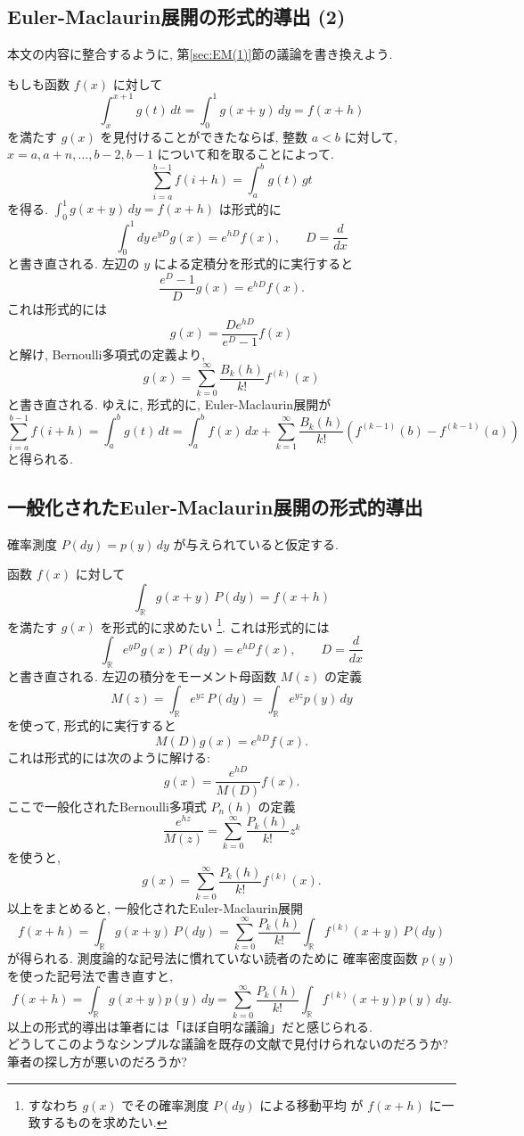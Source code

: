 \documentclass[12pt,twoside]{jarticle}
\newcommand\R{{\mathbb R}} %
\newcommand\PM{P} %
\newcommand\PDF{p} %
\theoremstyle{jplain}
\theoremstyle{jplain}
\theoremstyle{jplain}
\numberwithin{theorem}{section}
\numberwithin{equation}{section}
\numberwithin{figure}{section}
\numberwithin{table}{section}
\newcommand\secref[1]{第\ref{#1}節}
\begin{document}

\subsection{Euler-Maclaurin展開の形式的導出 (2)}

本文の内容に整合するように,
\secref{sec:EM(1)}の議論を書き換えよう.

もしも函数 $f(x)$ に対して
\[
  \int_x^{x+1}g(t)\,dt = \int_0^1 g(x+y)\,dy = f(x+h)
\]
を満たす $g(x)$ を見付けることができたならば,
整数 $a<b$ に対して, $x=a,a+n,\ldots,b-2,b-1$ について和を取ることによって.
\[
  \sum_{i=a}^{b-1} f(i+h) = \int_a^b g(t)\,gt
\]
を得る. $\int_0^1 g(x+y)\,dy=f(x+h)$ は形式的に
\[
  \int_0^1 dy\,e^{yD}g(x) = e^{hD}f(x), \qquad D=\frac{d}{dx}
\]
と書き直される. 左辺の $y$ による定積分を形式的に実行すると
\[
  \frac{e^D-1}{D}g(x) = e^{hD}f(x).
\]
これは形式的には
\[
  g(x) = \frac{De^{hD}}{e^D-1}f(x)
\]
と解け, Bernoulli多項式の定義より,
\[
  g(x) = \sum_{k=0}^\infty \frac{B_k(h)}{k!}f^{(k)}(x)
\]
と書き直される. ゆえに, 形式的に, Euler-Maclaurin展開が
\[
  \sum_{i=a}^{b-1}f(i+h)
  = \int_a^b g(t)\,dt
  = \int_a^b f(x)\,dx
  + \sum_{k=1}^\infty \frac{B_k(h)}{k!}(f^{(k-1)}(b)-f^{(k-1)}(a))
\]
と得られる.


\subsection{一般化されたEuler-Maclaurin展開の形式的導出}
\label{sec:formal-GEM}

確率測度 $\PM(dy)=\PDF(y)\,dy$ が与えられていると仮定する.

函数 $f(x)$ に対して
\[
  \int_\R g(x+y)\,\PM(dy) = f(x+h)
\]
を満たす $g(x)$ を形式的に求めたい%
\footnote{すなわち $g(x)$ でその確率測度 $\PM(dy)$ による移動平均
が $f(x+h)$ に一致するものを求めたい.}.
これは形式的には
\[
  \int_\R e^{yD} g(x)\,\PM(dy) = e^{hD}f(x),
  \qquad
  D = \frac{d}{dx}
\]
と書き直される. 左辺の積分をモーメント母函数 $M(z)$ の定義
\[
  M(z) = \int_\R e^{yz}\,\PM(dy) = \int_\R e^{yz}\PDF(y)\,dy
\]
を使って, 形式的に実行すると
\[
  M(D)g(x) = e^{hD}f(x).
\]
これは形式的には次のように解ける:
\[
  g(x) = \frac{e^{hD}}{M(D)}f(x).
\]
ここで一般化されたBernoulli多項式 $P_n(h)$ の定義
\[
  \frac{e^{hz}}{M(z)} = \sum_{k=0}^\infty \frac{P_k(h)}{k!}z^k
\]
を使うと,
\[
  g(x) = \sum_{k=0}^\infty \frac{P_k(h)}{k!}f^{(k)}(x).
\]
以上をまとめると, 一般化されたEuler-Maclaurin展開
\[
  f(x+h)
  = \int_\R g(x+y)\,\PM(dy)
  = \sum_{k=0}^\infty \frac{P_k(h)}{k!} \int_\R f^{(k)}(x+y)\,\PM(dy)
\]
が得られる. 測度論的な記号法に慣れていない読者のために
確率密度函数 $\PDF(y)$ を使った記号法で書き直すと,
\[
  f(x+h)
  = \int_\R g(x+y)\PDF(y)\,dy
  = \sum_{k=0}^\infty \frac{P_k(h)}{k!} \int_\R f^{(k)}(x+y)\PDF(y)\,dy.
\]
以上の形式的導出は筆者には「ほぼ自明な議論」だと感じられる.\\
どうしてこのようなシンプルな議論を既存の文献で見付けられないのだろうか?\\
筆者の探し方が悪いのだろうか?
\end{document}
